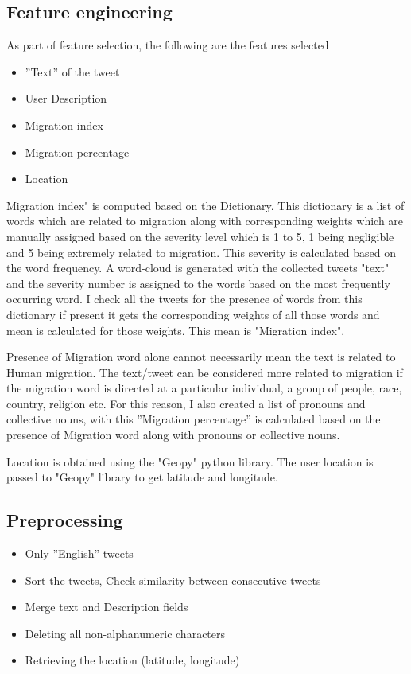 \subsection{Feature engineering}
As part of feature selection, the following are the features selected
\begin{itemize}
  \item ”Text” of the tweet
  \item  User Description
  \item  Migration index
  \item  Migration percentage
  \item  Location
\end{itemize}
 Migration index" is computed based on the Dictionary. This dictionary is a list of words which are related to migration along with corresponding weights which are manually assigned based on the severity level which is 1 to 5, 1 being negligible and 5 being extremely related to migration. This severity is calculated based on the word frequency. A word-cloud is generated with the collected tweets "text" and the severity number is assigned to the words based on the most frequently occurring word.
 I check all the tweets for the presence of words from this dictionary if present it gets the corresponding weights of all those words and mean is calculated for those weights. This mean is "Migration index". 
 


Presence of Migration word alone cannot necessarily mean the text is related
to Human migration. The text/tweet can be considered more related to migration if the migration word is directed at a particular individual, a group of
people, race, country, religion etc. For this reason, I also created a list of pronouns and collective nouns, with this ”Migration percentage” is calculated based on the presence of Migration word along with pronouns or collective nouns.   

Location is obtained using the "Geopy" python library. The user location is passed to "Geopy" library to get latitude and longitude. 


\subsection{Preprocessing}

\begin{itemize}
  \item Only ”English” tweets
  \item Sort the tweets, Check similarity between consecutive tweets
  \item Merge text and Description fields
  \item Deleting all non-alphanumeric characters
  \item Retrieving the location (latitude, longitude)
\end{itemize}


